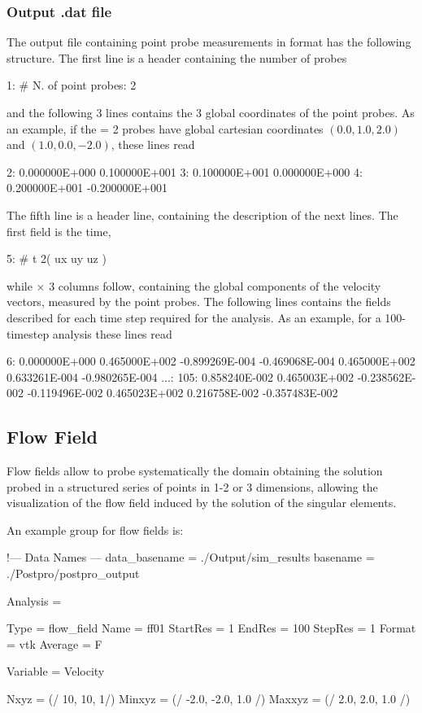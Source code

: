 \subsubsection{Output .dat file}

The output file containing point probe measurements in  format has the following structure. The first line is a header containing the number of probes
\begin{inputfile}[frame=single]
 1:  # N. of point probes:           2
\end{inputfile}
and the following 3 lines contains the 3 global coordinates of the point probes. As an example, if the  = 2 probes have global cartesian coordinates $(0.0,1.0,2.0)$ and $(1.0,0.0,-2.0)$, these lines read
\begin{inputfile}[frame=single]
 2:  0.000000E+000  0.100000E+001
 3:  0.100000E+001  0.000000E+000
 4:  0.200000E+001 -0.200000E+001
\end{inputfile}
The fifth line is a header line, containing the description of the next lines. The first field is the time,
\begin{inputfile}[frame=single]
 5:  #    t     2(   ux  uy  uz )
\end{inputfile}
while  $\times$ 3 columns follow, containing the global components of the velocity vectors, measured by the point probes. The following lines contains the fields described for each time step required for the analysis. As an example, for a 100-timestep analysis these lines read
\begin{inputfile}[frame=single]
  6: 0.000000E+000  0.465000E+002  -0.899269E-004  -0.469068E-004  0.465000E+002
     0.633261E-004 -0.980265E-004   
...:
105: 0.858240E-002  0.465003E+002  -0.238562E-002  -0.119496E-002  0.465023E+002
     0.216758E-002 -0.357483E-002
\end{inputfile}

\subsection{Flow Field}

Flow fields allow to probe systematically the domain obtaining the solution probed in a structured series of points in 1-2 or 3 dimensions, allowing the visualization of the flow field induced by the solution of the singular elements.

An example  group for flow fields is:

\begin{inputfile}[frame=single, caption={dust\_post.in for flow fields}, label={file:dust_post.in_flow_fields}]
!--- Data Names ---
data_basename = ./Output/sim_results
basename =     ./Postpro/postpro_output

Analysis = {

Type = flow_field
Name = ff01
StartRes = 1
EndRes   = 100 
StepRes  = 1
Format = vtk
Average = F

Variable = Velocity

Nxyz = (/ 10, 10, 1/)
Minxyz = (/ -2.0, -2.0, 1.0 /)
Maxxyz = (/ 2.0, 2.0, 1.0 /)
}
\end{inputfile}

